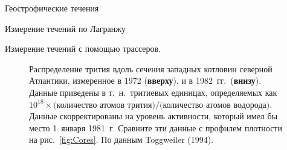 \begin{chapter}{Геострофические течения}
\begin{section}{Измерение течений по Лагранжу}
\begin{paragraph}{Измерение течений с помощью трассеров.}
\begin{figure}[t!]
\caption{Распределение трития вдоль сечения западных котловин
северной Атлантики, измеренное в 1972 (\textbf{вверху}), и в 1982~гг.\ 
(\textbf{внизу}). 
Данные приведены в т.~н.\ тритиевых единицах, определяемых как 
$10^{18}\times \text{(количество атомов трития)}/
\text{(количество атомов водорода)}$. Данные скорректированы на уровень 
активности, который имел бы место 1~января 1981~г. Сравните эти данные 
с профилем плотности на рис.~\ref{fig:Cores}. По данным Toggweiler (1994).}
\label{fig:tritium}
\end{figure}
%


\end{paragraph}
\end{section}
\end{chapter}
